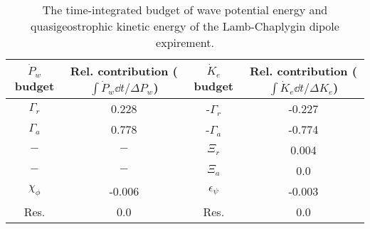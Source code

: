\begin{table}
\begin{center}
\caption{The time-integrated budget of wave potential energy and quasigeostrophic                kinetic energy of the Lamb-Chaplygin dipole expirement. \label{table1}}
\begin{tabular}{cccc}
\hline
$\dot{P}_w$ budget & Rel. contribution ($\int\dot{P}_w \dd t/\Delta P_w $) & $\dot{K}_e$ budget  & Rel. contribution ($\int\dot{K}_e \dd t/\Delta K_e$)\\
\hline
$\Gamma_r$ & 0.228 & -$\Gamma_r$ & -0.227 \\
$\Gamma_a$ & 0.778 & -$\Gamma_a$ & -0.774 \\
$-$ & $-$ & $\Xi_r$ & 0.004 \\
$-$ & $-$ & $\Xi_a$ & 0.0 \\
$\chi_\phi$ & -0.006 & $\epsilon_\psi$ & -0.003 \\
Res. & 0.0 & Res. & 0.0 \\
\end{tabular}
\end{center}
\end{table}
